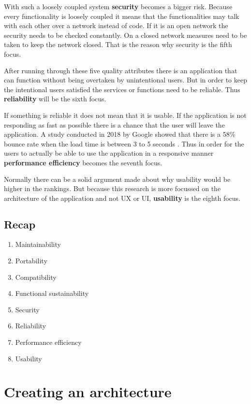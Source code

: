With such a loosely coupled system \textbf{security} becomes a bigger risk. Because every functionality is loosely coupled it means that the functionalities may talk with each other over a network instead of code. If it is an open network the security needs to be checked constantly. On a closed network measures need to be taken to keep the network closed. That is the reason why security is the fifth focus.

After running through these five quality attributes there is an application that can function without being overtaken by unintentional users. But in order to keep the intentional users satisfied the services or functions need to be reliable. Thus \textbf{reliability} will be the sixth focus.

If something is reliable it does not mean that it is usable. If the application is not responding as fast as possible there is a chance that the user will leave the application. A study conducted in 2018 by Google showed that there is a 58\% bounce rate when the load time is between 3 to 5 seconds \cite{bounceRateDifference}. Thus in order for the users to actually be able to use the application in a responsive manner \textbf{performance efficiency} becomes the seventh focus.

Normally there can be a solid argument made about why usability would be higher in the rankings. But because this research is more focussed on the architecture of the application and not UX or UI, \textbf{usability} is the eighth focus.

\subsection{Recap}
\label{sec:IsoRecap}

\begin{enumerate}
        \item Maintainability
        \item Portability
        \item Compatibility
        \item Functional sustainability
        \item Security
        \item Reliability
        \item Performance efficiency
        \item Usability
\end{enumerate}

\section{Creating an architecture}

